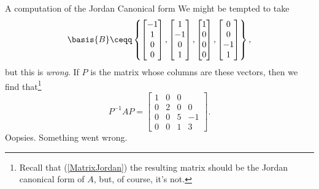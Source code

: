 \begin{exm}{A computation of the Jordan Canonical form}{}
	We might be tempted to take
	\begin{equation}
		\basis{B}\ceqq \left\{ \begin{bmatrix}-1 \\ 1 \\ 0 \\ 0\end{bmatrix},\begin{bmatrix}1 \\ -1 \\ 0 \\ 1\end{bmatrix},\begin{bmatrix}1 \\ 0 \\ 0 \\ 0\end{bmatrix},\begin{bmatrix}0 \\ 0 \\ -1 \\ 1\end{bmatrix}\right\} ,
	\end{equation}
	but this is \emph{wrong}.  If $P$ is the matrix whose columns are these vectors, then we find that\footnote{Recall that (\cref{MatrixJordan}) the resulting matrix should be the Jordan canonical form of $A$, but, of course, it's not.}
	\begin{equation}
		P^{-1}AP=\begin{bmatrix}1 & 0 & 0 \\ 0 & 2 & 0 & 0 \\ 0 & 0 & 5 & -1 \\ 0 & 0 & 1 & 3\end{bmatrix}.
	\end{equation}
	Oopsies.  Something went wrong.
	

\end{exm}
